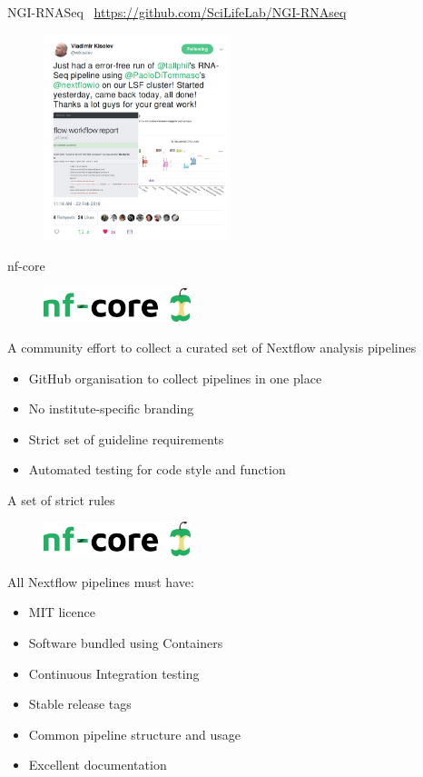 \documentclass{beamer}
\begin{document}
\begin{frame}{NGI-RNASeq}
	\faGlobe\ \url{https://github.com/SciLifeLab/NGI-RNAseq}
	\begin{figure}
		\includegraphics[height=6cm]{pictures/ErrorFreeRun.png}
	\end{figure}
\end{frame}

\begin{frame}{nf-core}
	\begin{figure}
		\includegraphics[height=1cm]{pictures/nf-core}
	\end{figure}
	A community effort to collect a curated set of Nextflow analysis pipelines
	\begin{itemize}
		\item GitHub organisation to collect pipelines in one place
		\item No institute-specific branding
		\item Strict set of guideline requirements
		\item Automated testing for code style and function
	\end{itemize}
\end{frame}

\begin{frame}{A set of strict rules}
	\begin{figure}
		\includegraphics[height=1cm]{pictures/nf-core}
	\end{figure}
	All Nextflow pipelines must have:
	\begin{itemize}
		\item MIT licence
		\item Software bundled using Containers
		\item Continuous Integration testing
		\item Stable release tags
		\item Common pipeline structure and usage
		\item Excellent documentation
	\end{itemize}
\end{frame}
\end{document}
